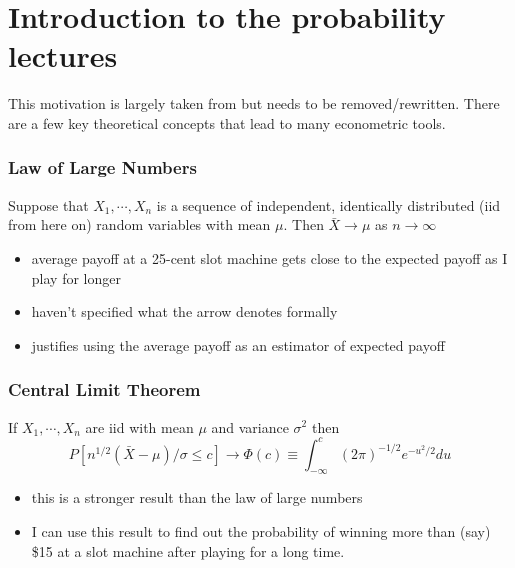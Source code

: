 
\part*{Introduction to the probability lectures}%

This motivation is largely taken from \citet{Res_1999} but needs to be
removed/rewritten.  There are a few key theoretical concepts that lead
to many econometric tools.

\section{Law of Large Numbers}

     Suppose that $X_1,\cdots,X_n$ is a sequence of independent,
     identically distributed (iid from here on) random variables with
     mean $\mu$.  Then $\bar X \to \mu$ as $n \to \infty$
\begin{itemize}
\item average payoff at a 25-cent slot machine gets close to the
       expected payoff as I play for longer
\item haven't specified what the arrow denotes formally
\item justifies using the average payoff as an estimator of expected
       payoff
\end{itemize}
\section{Central Limit Theorem}

     If $X_1,\cdots,X_n$ are iid with mean $\mu$ and variance $\sigma$$^2$
     then
     \[ P[n^{1/2}(\bar X - \mu)/\sigma \leq c] \to \Phi(c)
      \equiv \int_{-\infty}^c (2\pi)^{-1/2} e^{-u^2/2} du
     \]
\begin{itemize}
\item this is a stronger result than the law of large numbers
\item I can use this result to find out the probability of winning more
       than (say) \$15 at a slot machine after playing for a long time.
\end{itemize}

